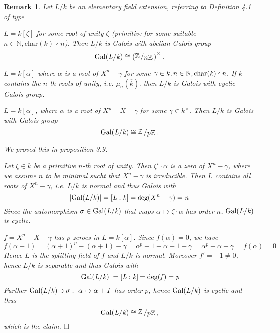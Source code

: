 \documentclass[11pt]{book}
\newtheorem{remark}[theorem]{Remark}
\theoremstyle{nonumberbreak}
\newenvironment{pr}[1][]{\ifthenelse{\equal{#1}{}}{\proof}{\proof[#1]}\rm}{\endproof}
\newcommand{\slant}[2]{{\raisebox{.1em}{$#1$}\left/\raisebox{-.1em}{$#2$}\right.}}
\begin{document}
\begin{spacing}{1.3}
\begin{remark} %
Let $L/k$ be an elementary field extension, referring to Definition 4.1 of type
\begin{compactenum}
\item[\rm(1)] $L=k[\zeta]$ for some root of unity $\zeta$ (primitive for some suitable $n \in \mathbb{N}, \textrm{char}(k) \nmid n$). Then $L/k$ is Galois with abelian Galois group $$\gal(L/k) \cong \left(\slant{\mathbb{Z}}{n \mathbb{Z}}\right)^{\times}.$$
\item[\rm(2)] $L=k[\alpha]$ where $\alpha$ is a root of $X^n-\gamma$ for some $\gamma \in k, n \in \mathbb{N}, \rm{char}\it(k) \nmid n$. If $k$ contains the $n$-th roots of unity, i.e. $\mu_n(\overline{k})$, then $L/k$ is Galois with cyclic Galois group.
\item[\rm(3)] $L=k[\alpha]$, where $\alpha$ is a root of $X^p-X-\gamma$ for some $\gamma \in k^{\times}$. Then $L/k$ is Galois with Galois group $$\gal(L/k) \cong \slant{\mathbb{Z}}{p \mathbb{Z}}.$$
\end{compactenum}
\begin{pr}
\begin{compactenum}
\item[(1)] We proved this in proposition 3.9.
\item[(2)] Let $\zeta \in k$ be a primitive $n$-th root of unity. Then $\zeta^{i} \cdot \alpha$ is a zero of $X^n-\gamma$, where we assume $n$ to be minimal sucht that $X^n-\gamma$ is irreducible. Then $L$ contains all roots of $X^n-\gamma$, i.e. $L/k$ is normal and thus Galois with $$ \vert \rm{Gal}\it(L/k) \vert = [L:k]=\textrm{deg}(X^n-\gamma)=n$$ Since the automorphism $\sigma \in \rm{Gal}\it(L/k)$ that maps $\alpha \mapsto \zeta \cdot \alpha$ has order $n$, $\rm{Gal}\it(L/k)$ is cyclic.
\item[(3)] $f=X^p-X-\gamma$ has $p$ zeroes in $L=k[\alpha]$. Since 
$f(\alpha)=0$, we have $$f(\alpha+1)=\left(\alpha+1\right)^p-\left(\alpha+1\right)-\gamma=\alpha^p+1-\alpha-1-\gamma=\alpha^p-\alpha-\gamma =f(\alpha)=0$$
Hence $L$ is the splitting field of $f$ and $L/k$ is normal. Moreover $f'=-1 \neq 0$, hence $L/k$ is separable and thus Galois with $$\vert \rm{Gal}\it(L/k) \vert = [L:k]=\deg(f)=p$$
Further $\rm{Gal}\it(L/k)\ni \sigma: \ \alpha \mapsto \alpha +1$ has order $p$, hence $\rm{Gal}\it(L/k)$ is cyclic and thus $$\gal(L/k) \cong \slant{\mathbb{Z}}{p \mathbb{Z}},$$
which is the claim. $\hfill \Box$
\end{compactenum}
\end{pr}
\end{remark}



\end{spacing}
\end{document}
